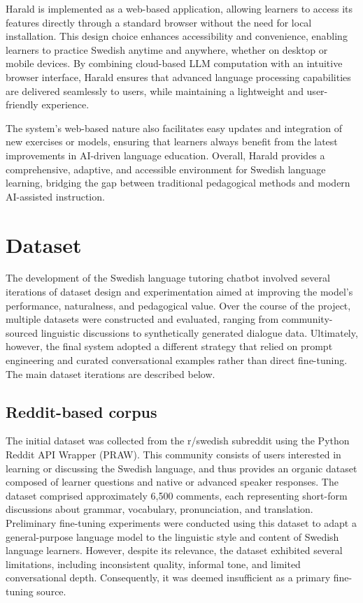 \documentclass[a4paper,10pt]{article}
\begin{document}
Harald is implemented as a web-based application, allowing learners to access its features directly through a standard browser without the need for local installation. This design choice enhances accessibility and convenience, enabling learners to practice Swedish anytime and anywhere, whether on desktop or mobile devices. By combining cloud-based LLM computation with an intuitive browser interface, Harald ensures that advanced language processing capabilities are delivered seamlessly to users, while maintaining a lightweight and user-friendly experience.

The system’s web-based nature also facilitates easy updates and integration of new exercises or models, ensuring that learners always benefit from the latest improvements in AI-driven language education. Overall, Harald provides a comprehensive, adaptive, and accessible environment for Swedish language learning, bridging the gap between traditional pedagogical methods and modern AI-assisted instruction.


\section{Dataset}

The development of the Swedish language tutoring chatbot involved several iterations of dataset design and experimentation aimed at improving the model’s performance, naturalness, and pedagogical value. Over the course of the project, multiple datasets were constructed and evaluated, ranging from community-sourced linguistic discussions to synthetically generated dialogue data. Ultimately, however, the final system adopted a different strategy that relied on prompt engineering and curated conversational examples rather than direct fine-tuning. The main dataset iterations are described below.

\subsection{Reddit-based corpus}
The initial dataset was collected from the r/swedish subreddit using the Python Reddit API Wrapper (PRAW). This community consists of users interested in learning or discussing the Swedish language, and thus provides an organic dataset composed of learner questions and native or advanced speaker responses. The dataset comprised approximately 6,500 comments, each representing short-form discussions about grammar, vocabulary, pronunciation, and translation. Preliminary fine-tuning experiments were conducted using this dataset to adapt a general-purpose language model to the linguistic style and content of Swedish language learners. However, despite its relevance, the dataset exhibited several limitations, including inconsistent quality, informal tone, and limited conversational depth. Consequently, it was deemed insufficient as a primary fine-tuning source.
\end{document}

